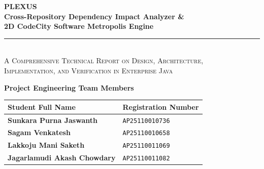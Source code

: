 \documentclass[11pt,a4paper,openany]{report}
\begin{document}
\begin{titlepage}
    \centering
    \vspace*{0.3cm}
    
    {\Huge \textbf{\textcolor{primary}{PLEXUS}}}\\[0.25cm]
    {\LARGE \textbf{Cross-Repository Dependency Impact Analyzer \&}}\\[0.15cm]
    {\LARGE \textbf{2D CodeCity Software Metropolis Engine}}\\[0.5cm]
    
    \rule{0.92\textwidth}{1.5pt}\\[0.4cm]
    
    {\large \textsc{A Comprehensive Technical Report on Design, Architecture,}}\\[0.1cm]
    {\large \textsc{Implementation, and Verification in Enterprise Java}}\\[0.6cm]

    \begin{tcolorbox}[colback=lightbg,colframe=primary,arc=2mm,width=0.92\textwidth]
        \centering
        \textbf{\large Project Engineering Team Members}\\[0.25cm]
        \begin{tabular}{p{7.0cm} p{4.5cm}}
            \textbf{Student Full Name} & \textbf{Registration Number} \\
            \midrule
            \textbf{Sunkara Purna Jaswanth} & \texttt{AP25110010736} \\
            \textbf{Sagam Venkatesh} & \texttt{AP25110010658} \\
            \textbf{Lakkoju Mani Saketh} & \texttt{AP25110011069} \\
            \textbf{Jagarlamudi Akash Chowdary} & \texttt{AP25110011082} \\
        \end{tabular}
    \end{tcolorbox}

    \vspace{0.4cm}


\end{titlepage}
\end{document}
